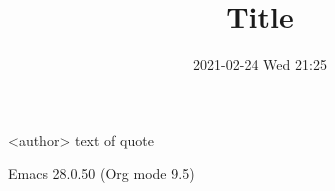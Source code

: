 \documentclass[a4paper,11pt]{article}
\date{2021-02-24 Wed 21:25}
\title{Title}
\begin{document}
\maketitle
\tableofcontents

\begin{shadequote}[<alignment>]{<author>}
   text of quote
\end{shadequote}
Emacs 28.0.50 (Org mode 9.5)
\end{document}
